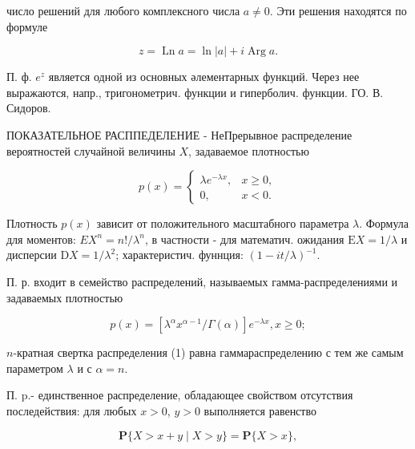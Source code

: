 \documentclass[10pt]{article}
\begin{document}
число решений для любого комплексного числа $a \neq 0$. Эти решения находятся по формуле



\[

z=\operatorname{Ln} a=\ln |a|+i \operatorname{Arg} a .

\]



П. ф. $e^{z}$ является одной из основных әлементарных функций. Через нее выражаются, напр., тригонометрич. функции и гиперболич. функции. ГО. В. Сидоров.



ПОКАЗАТЕЛЬНОЕ РАСППЕДЕЛЕНИЕ - НеПрерывное распределение вероятностей случайной величины $X$, задаваемое плотностью



\[

p(x)= \begin{cases}\lambda e^{-\lambda x}, & x \geqslant 0, \\ 0, & x<0 .\end{cases}

\]



Плотность $p(x)$ зависит от положительного масштабного параметра $\lambda$. Формула для моментов: $E X^{n}=n ! / \lambda^{n}$, в частности - для математич. ожидания $\mathrm{E} X=1 / \lambda$ и дисперсии $\mathrm{D} X=1 / \lambda^{2}$; характеристич. фуннция: $(1-i t / \lambda)^{-1}$.



П. р. входит в семейство распределений, называемых гамма-распределениями и задаваемых плотностью



\[

p(x)=\left[\lambda^{\alpha} x^{\alpha-1} / \Gamma(\alpha)\right] e^{-\lambda x}, x \geqslant 0 ;

\]



$n$-кратная свертка распределения (1) равна гаммараспределению с тем же самым параметром $\lambda$ и с $\alpha=n$.



П. p.- единственное распределение, обладающее свойством отсутствия последействия: для любых $x>0$, $y>0$ выполняется равенство



\[

\mathbf{P}\{X>x+y \mid X>y\}=\mathbf{P}\{X>x\},

\]
\end{document}
